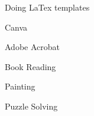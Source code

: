 \documentclass[11pt]{spidercv}
\begin{document}
\begin{SideBar}{\ColorBackground}{\ColorTextSide}
\begin{SkillGauges}{\ColorHighlight}
        \end{SkillGauges}
        
        
    
        \vspace*{0.5cm} 
        \begin{ItemList}{\ColorHighlight}
            \item [] Doing LaTex templates
            \item [] Canva
            \item [] Adobe Acrobat
            \item [] Book Reading
            \item [] Painting
            \item [] Puzzle Solving
        \end{ItemList}
       


        
    \end{SideBar}

    

\end{document}

